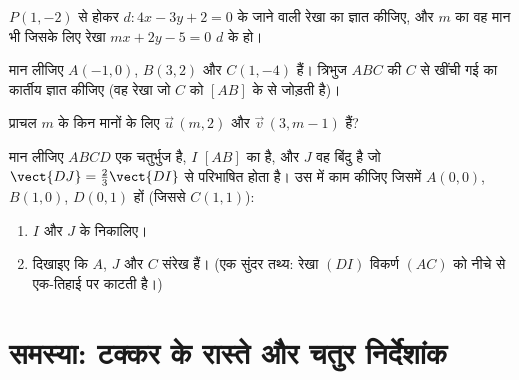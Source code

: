 \begin{exercise}[$\star\star$]\label{exo:g11:vect:8}
$P(1, -2)$ से होकर $d: 4x - 3y + 2 = 0$ के  जाने वाली रेखा का  ज्ञात कीजिए, और
$m$ का वह मान भी जिसके लिए रेखा $mx + 2y - 5 = 0$ $d$ के  हो।
\end{exercise}

\begin{exercise}[$\star\star$]\label{exo:g11:vect:9}
मान लीजिए $A(-1, 0)$, $B(3, 2)$ और $C(1, -4)$ हैं। त्रिभुज $ABC$ की $C$ से खींची गई
\emph{} का कार्तीय  ज्ञात कीजिए (वह रेखा जो $C$ को $[AB]$ के
 से जोड़ती है)।
\end{exercise}

\begin{exercise}[$\star\star$]\label{exo:g11:vect:10}
प्राचल $m$ के किन मानों के लिए  $\vec u\,(m, 2)$ और $\vec v\,(3, m - 1)$  हैं?
\end{exercise}

\begin{exercise}[$\star\star\star$]\label{exo:g11:vect:11}
मान लीजिए $ABCD$ एक  चतुर्भुज है, $I$ $[AB]$ का  है, और $J$
वह बिंदु है जो $\vect{DJ} = \frac23 \vect{DI}$ से परिभाषित होता है। उस  में काम कीजिए
जिसमें $A(0,0)$, $B(1,0)$, $D(0,1)$ हों (जिससे $C(1,1)$):
\begin{enumerate}
  \item $I$ और $J$ के  निकालिए।
  \item दिखाइए कि $A$, $J$ और $C$ संरेख हैं। (एक सुंदर तथ्य: रेखा
        $(DI)$ विकर्ण $(AC)$ को नीचे से एक-तिहाई पर काटती है।)
\end{enumerate}
\end{exercise}

\section{समस्या: टक्कर के रास्ते और चतुर निर्देशांक}


